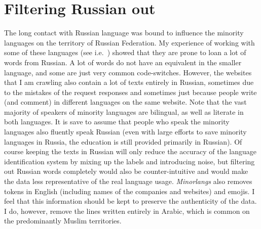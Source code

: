 \section{Filtering Russian out}
The long contact with Russian language was bound to influence the minority languages on the territory of Russian Federation. My experience of working with some of these languages (see i.e.\ \cite{clif}) showed that they are prone to loan a lot of words from Russian. A lot of words do not have an equivalent in the smaller language, and some are just very common code-switches. However, the websites that I am crawling also contain a lot of texts entirely in Russian, sometimes due to the mistakes of the request responses and sometimes just because people write (and comment) in different languages on the same website. Note that the vast majority of speakers of minority languages are bilingual, as well as literate in both languages. It is save to assume that people who speak the minority languages also fluently speak Russian (even with large efforts to save minority languages in Russia, the education is still provided primarily in Russian). 
Of course keeping the texts in Russian will only reduce the accuracy of the language identification system by mixing up the labels and introducing noise, but filtering out Russian words completely would also be counter-intuitive and would make the data less representative of the real language usage. \textit{Minorlangs} also removes tokens in English (including names of the companies and websites) and emojis. I feel that this information should be kept to preserve the authenticity of the data. I do, however, remove the lines written entirely in Arabic, which is common on the predominantly Muslim territories.

